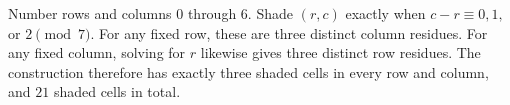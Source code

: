 Number rows and columns $0$ through $6$. Shade $(r,c)$ exactly when $c-r\equiv0,1,$ or $2\pmod7$. For any fixed row, these are three distinct column residues. For any fixed column, solving for $r$ likewise gives three distinct row residues. The construction therefore has exactly three shaded cells in every row and column, and $21$ shaded cells in total.
